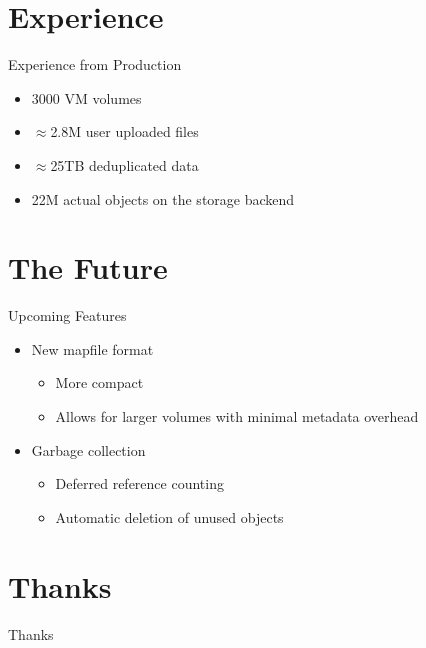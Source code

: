 \documentclass[utf8]{beamer}
\begin{document}
\section{Experience}

\begin{frame}{Experience from Production}
\begin{itemize}
  \item 3000 VM volumes
  \item $\approx$2.8M user uploaded files
  \item $\approx$25TB deduplicated data
  \item 22M actual objects on the storage backend
\end{itemize}
\end{frame}

\section{The Future}

\begin{frame}{Upcoming Features}
  \begin{itemize}
    \item New mapfile format
      \begin{itemize}
      \item More compact
      \item Allows for larger volumes with minimal metadata overhead
      \end{itemize}
    \item Garbage collection
      \begin{itemize}
      \item Deferred reference counting
      \item Automatic deletion of unused objects
      \end{itemize}
    \end{itemize}
\end{frame}

\section{Thanks}

\begin{frame}{Thanks}

\end{frame}
\end{document}
